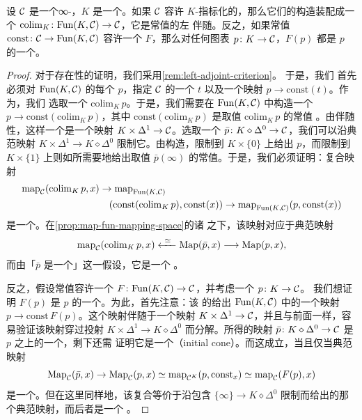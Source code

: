 \begin{proposition}\label{prop:colimit-adjoint}
设 $\mathcal{C}$ 是一个∞-\trCategory{}，$K$ 是一个\trSimplicialSet{}。如果 $\mathcal{C}$ 容许
$K$-指标化的\trColimit{}，那么它们的构造装配成一个\trFunctor{}%
$\mathrm{colim}_K\colon \mathrm{Fun}(K, \mathcal{C}) \to \mathcal{C}$，它是常值\trFunctor{}的左
伴随。反之，如果常值\trFunctor{}%
$\mathrm{const}\colon \mathcal{C} \to \mathrm{Fun}(K, \mathcal{C})$ 容许一个\trLeftAdjoint{}%
$F$，那么对任何图表 $p\colon K \to \mathcal{C}$，$F(p)$ 都是 $p$ 的一个\trColimit{}。
\end{proposition}

\begin{proof}
对于\trLeftAdjoint{}存在性的证明，我们采用\cref{rem:left-adjoint-criterion}。
于是，我们
首先必须对 $\mathrm{Fun}(K, \mathcal{C})$ 的每个\trObject{} $p$，指定 $\mathcal{C}$ 的一个%
\trObject{} $t$ 以及一个映射 $p \to \mathrm{const}(t)$。作为\trObject{}，我们
选取一个\trColimit{} $\mathrm{colim}_K\, p$。于是，我们需要在
$\mathrm{Fun}(K, \mathcal{C})$ 中构造一个\trMorphism{}%
$p \to \mathrm{const}(\mathrm{colim}_K\, p)$，其中
$\mathrm{const}(\mathrm{colim}_K\, p)$ 是取值 $\mathrm{colim}_K\, p$ 的常值%
\trFunctor{}。由伴随性，这样一个\trMorphism{}是一个映射
$K \times \Delta^1 \to \mathcal{C}$。选取一个\trColimit{}\trCone{}%
$\bar{p}\colon K \diamond \Delta^0 \to \mathcal{C}$，我们可以沿典范映射
$K \times \Delta^1 \to K \diamond \Delta^0$ 限制它。由构造，限制到
$K \times \{0\}$ 上给出 $p$，而限制到 $K \times \{1\}$ 上则如所需要地给出取值
$\bar{p}(\infty)$ 的常值\trFunctor{}。于是，我们必须证明：复合映射
\[
\begin{aligned}
\mathrm{map}_{\mathcal{C}}(\mathrm{colim}_K\, p, x)
  &\to \mathrm{map}_{\mathrm{Fun}(K, \mathcal{C})}\\
&\quad (\mathrm{const}(\mathrm{colim}_K\, p), \mathrm{const}(x))
  \to \mathrm{map}_{\mathrm{Fun}(K, \mathcal{C})}(p, \mathrm{const}(x))
\end{aligned}
\]
是一个\trEquivalence{}。在\cref{prop:map-fun-mapping-space}的诸\trEquivalence{}%
之下，该映射对应于典范映射
\[
\mathrm{map}_{\mathcal{C}}(\mathrm{colim}_K\, p, x)
  \xleftarrow{\ \simeq\ } \mathrm{Map}(\bar{p}, x)
  \longrightarrow \mathrm{Map}(p, x),
\]
而由「$\bar{p}$ 是一个\trColimit{}\trCone{}」这一假设，它是一个%
\trEquivalence{}。

反之，假设常值\trFunctor{}容许一个\trLeftAdjoint{}%
$F\colon \mathrm{Fun}(K, \mathcal{C}) \to \mathcal{C}$，并考虑一个\trFunctor{} $p\colon K \to \mathcal{C}$。
我们想证明 $F(p)$ 是 $p$ 的一个\trColimit{}。为此，首先注意：该\trAdjunction{}%
的\trUnit{}给出 $\mathrm{Fun}(K, \mathcal{C})$ 中的一个映射
$p \to \mathrm{const}\, F(p)$。这个映射伴随于一个映射
$K \times \Delta^1 \to \mathcal{C}$，并且与前面一样，容易验证该映射穿过投射
$K \times \Delta^1 \to K \diamond \Delta^0$ 而分解。所得的映射
$\bar{p}\colon K \diamond \Delta^0 \to \mathcal{C}$ 是 $p$ 之上的一个\trCone{}，剩下还需
证明它是一个\trInitialCone{}（initial cone）。而这成立，当且仅当典范映射
\[
\mathrm{Map}_{\mathcal{C}}(\bar{p}, x) \to \mathrm{Map}_{\mathcal{C}}(p, x) \simeq
\mathrm{map}_{\mathcal{C}^K}(p, \mathrm{const}_x) \simeq
\mathrm{map}_{\mathcal{C}}(F(p), x)
\]
是一个\trEquivalence{}。但在这里同样地，该复合等价于沿包含
$\{\infty\} \to K \diamond \Delta^0$ 限制而给出的那个典范映射，而后者是一个%
\trEquivalence{}。
\end{proof}

